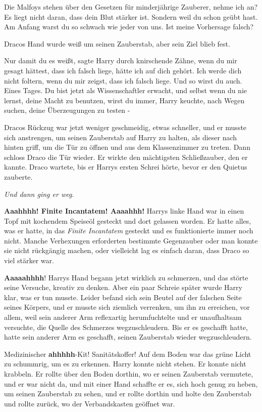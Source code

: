 \glqq Die Malfoys stehen über den Gesetzen für minderjährige Zauberer, nehme ich
an? Es liegt nicht daran, dass dein Blut stärker ist. Sondern weil du schon
geübt hast. Am Anfang warst du so schwach wie jeder von uns. Ist meine
Vorhersage falsch?\grqq{}

Dracos Hand wurde weiß um seinen Zauberstab, aber sein Ziel blieb fest.

\glqq Nur damit du es weißt\grqq{}, sagte Harry durch knirschende Zähne, \glqq
wenn du mir gesagt hättest, dass ich falsch liege, hätte ich auf dich gehört.
Ich werde dich nicht foltern, wenn du mir zeigst, dass ich falsch liege. Und so
wirst du auch. Eines Tages. Du bist jetzt als Wissenschaftler erwacht, und
selbst wenn du nie lernst, deine Macht zu benutzen, wirst du immer\grqq{}, Harry
keuchte, \glqq nach Wegen suchen, deine Überzeugungen zu testen -\grqq{}

Dracos Rückzug war jetzt weniger geschmeidig, etwas schneller, und er musste
sich anstrengen, um seinen Zauberstab auf Harry zu halten, als dieser nach
hinten griff, um die Tür zu öffnen und aus dem Klassenzimmer zu treten. Dann
schloss Draco die Tür wieder. Er wirkte den mächtigsten Schließzauber, den er
kannte. Draco wartete, bis er Harrys ersten Schrei hörte, bevor er den Quietus
zauberte.

\emph{ Und dann ging er weg. }


\textbf{\glqq Aaahhhh! Finite Incantatem! Aaaahhh!}\grqq{} Harrys linke Hand war
in einen Topf mit kochendem Speiseöl gesteckt und dort gelassen worden. Er hatte
alles, was er hatte, in das \emph{Finite Incantatem} gesteckt und es
funktionierte immer noch nicht. Manche Verhexungen erforderten bestimmte
Gegenzauber oder man konnte sie nicht rückgängig machen, oder vielleicht lag es
einfach daran, dass Draco so viel stärker war.

\glqq \textbf{Aaaaahhhh}!\grqq{} Harrys Hand begann jetzt wirklich zu schmerzen,
und das störte seine Versuche, kreativ zu denken. Aber ein paar Schreie später
wurde Harry klar, was er tun musste. Leider befand sich sein Beutel auf der
falschen Seite seines Körpers, und er musste sich ziemlich verrenken, um ihn zu
erreichen, vor allem, weil sein anderer Arm reflexartig herumfuchtelte und er
unaufhaltsam versuchte, die Quelle des Schmerzes wegzuschleudern. Bis er es
geschafft hatte, hatte sein anderer Arm es geschafft, seinen Zauberstab wieder
wegzuschleudern.

\glqq Medizinischer \textbf{ahhhhh}-Kit! Sanitätskoffer!\grqq{} Auf dem Boden
war das grüne Licht zu schummrig, um es zu erkennen. Harry konnte nicht stehen.
Er konnte nicht krabbeln. Er rollte über den Boden dorthin, wo er seinen
Zauberstab vermutete, und er war nicht da, und mit einer Hand schaffte er es,
sich hoch genug zu heben, um seinen Zauberstab zu sehen, und er rollte dorthin
und holte den Zauberstab und rollte zurück, wo der Verbandskasten geöffnet war.

